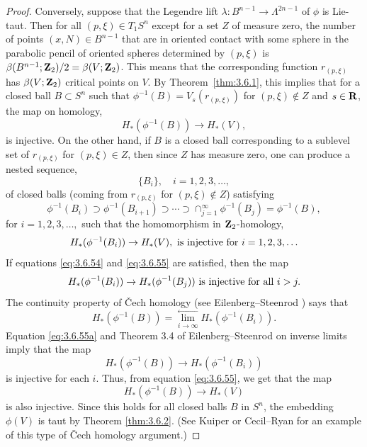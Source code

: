 \documentclass[12pt]{article}
\begin{document}
\begin{proof}
Conversely, suppose that the Legendre lift $\lambda: B^{n-1} \rightarrow \Lambda^{2n-1}$ of $\phi$ is Lie-taut.
Then for all $(p,\xi) \in T_1S^n$ except for a set $Z$ of measure zero, the number of points
$(x,N) \in B^{n-1}$ that are in oriented contact with some sphere
in the parabolic pencil of oriented spheres determined by $(p,\xi)$ is $\beta(B^{n-1};{\bf Z}_2)/2 = \beta(V;{\bf Z}_2)$.
This means that the corresponding
function $r_{(p,\xi)}$ has $\beta(V;{\bf Z}_2)$ critical points on $V$.
By Theorem~\ref{thm:3.6.1}, this implies that for a closed ball $B \subset S^n$ such that $\phi^{-1}(B) = V_s(r_{(p,\xi)})$ 
for $(p,\xi) \notin Z$ and $s \in {\bf R}$, the map on homology,
\begin{equation}
\label{eq:3.6.53}
H_*(\phi^{-1}(B)) \rightarrow H_*(V),
\end{equation}
is injective. On the other hand, 
if $B$ is a closed ball corresponding to a sublevel set of $r_{(p,\xi)}$ for $(p,\xi) \in Z$,
then since $Z$ has measure zero, one can produce a nested sequence,
\begin{displaymath}
\{B_i\}, \quad i= 1,2,3,\ldots,
\end{displaymath}
of closed balls (coming from $r_{(p,\xi)}$ for 
$(p,\xi) \notin Z$) satisfying 
\begin{equation}
\label{eq:3.6.54}
\phi^{-1}(B_i) \supset \phi^{-1}(B_{i+1}) \supset \cdots \supset \cap_{j=1}^\infty \phi^{-1}(B_j) = \phi^{-1}(B),
\end{equation}
for $i= 1,2,3,\ldots,$ such that the homomorphism in ${\bf Z}_2$-homology,
\begin{equation}
\label{eq:3.6.55}
H_*(\phi^{-1}(B_i)) \rightarrow H_*(V),\ {\mbox{\rm is injective for }}i= 1,2,3,\ldots
\end{equation}
If equations \eqref{eq:3.6.54} and \eqref{eq:3.6.55} are satisfied, then the map
\begin{equation}
\label{eq:3.6.55a}
H_*(\phi^{-1}(B_i)) \rightarrow H_*(\phi^{-1}(B_j))\ {\mbox{\rm is injective for all }}i > j.
\end{equation}
The continuity property of \v{C}ech homology
(see Eilenberg--Steenrod \cite[p. 261]{EiS}) says that
\begin{displaymath}
H_*(\phi^{-1}(B)) = \stackrel{\leftarrow}{\lim_{i \rightarrow \infty}} H_*(\phi^{-1}(B_i)).
\end{displaymath}
Equation \eqref{eq:3.6.55a} and Theorem 3.4 of Eilenberg--Steenrod \cite[p. 216]{EiS} on 
inverse limits imply that the map
\begin{displaymath}
H_*(\phi^{-1}(B)) \rightarrow H_*(\phi^{-1}(B_i))
\end{displaymath}
is injective for each $i$.  Thus, from equation \eqref{eq:3.6.55}, we get that the map
\begin{displaymath}
H_*(\phi^{-1}(B)) \rightarrow H_*(V)
\end{displaymath}
is also injective.  Since this holds for all closed balls $B$ in $S^n$, the embedding $\phi(V)$ is taut by
Theorem \ref{thm:3.6.2}. (See Kuiper \cite{Ku3} or
Cecil--Ryan \cite[Theorem 5.4, pp. 25--26]{CR7} for an example
of this type of \v{C}ech homology argument.)
\end{proof}
\end{document}
